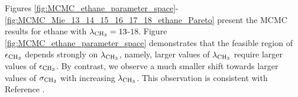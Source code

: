 \documentclass[preprint,letterpaper,floatfix,citeautoscript,aip,jcp]{revtex4-1}
\begin{document}
%
%
%

Figures \ref{fig:MCMC_ethane_parameter_space}-\ref{fig:MCMC_Mie_13_14_15_16_17_18_ethane_Pareto} present the MCMC results for ethane with $\lambda_{\rm CH_3} =13$-$18$. Figure \ref{fig:MCMC_ethane_parameter_space} demonstrates that the feasible region of $\epsilon_{\rm CH_3}$ depends strongly on $\lambda_{\rm CH_3}$, namely, larger values of $\lambda_{\rm CH_3}$ require larger values of $\epsilon_{\rm CH_3}$. By contrast, we observe a much smaller shift towards larger values of $\sigma_{\rm CH_3}$ with increasing $\lambda_{\rm CH_3}$. This observation is consistent with Reference .
\end{document}
